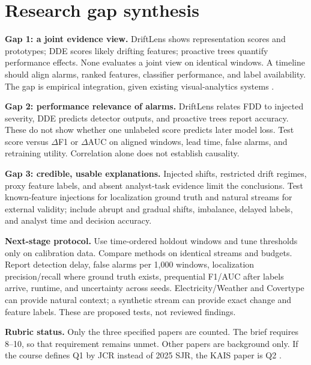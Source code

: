 \documentclass[10pt,a4paper]{article}
\begin{document}
\section*{Research gap synthesis}
\textbf{Gap 1: a joint evidence view.} DriftLens shows representation scores and prototypes; DDE scores likely drifting features; proactive trees quantify performance effects. None evaluates a joint view on identical windows. A timeline should align alarms, ranked features, classifier performance, and label availability. The gap is empirical integration, given existing visual-analytics systems \cite{driftvis,conceptexplorer}.

\textbf{Gap 2: performance relevance of alarms.} DriftLens relates FDD to injected severity, DDE predicts detector outputs, and proactive trees report accuracy. These do not show whether one unlabeled score predicts later model loss. Test score versus $\Delta$F1 or $\Delta$AUC on aligned windows, lead time, false alarms, and retraining utility. Correlation alone does not establish causality.

\textbf{Gap 3: credible, usable explanations.} Injected shifts, restricted drift regimes, proxy feature labels, and absent analyst-task evidence limit the conclusions. Test known-feature injections for localization ground truth and natural streams for external validity; include abrupt and gradual shifts, imbalance, delayed labels, and analyst time and decision accuracy.

\textbf{Next-stage protocol.} Use time-ordered holdout windows and tune thresholds only on calibration data. Compare methods on identical streams and budgets. Report detection delay, false alarms per 1,000 windows, localization precision/recall where ground truth exists, prequential F1/AUC after labels arrive, runtime, and uncertainty across seeds. Electricity/Weather and Covertype can provide natural context; a synthetic stream can provide exact change and feature labels. These are proposed tests, not reviewed findings.

\textbf{Rubric status.} Only the three specified papers are counted. The brief requires 8--10, so that requirement remains unmet. Other papers are background only. If the course defines Q1 by JCR instead of 2025 SJR, the KAIS paper is Q2 \cite{ranking}.
\end{document}
